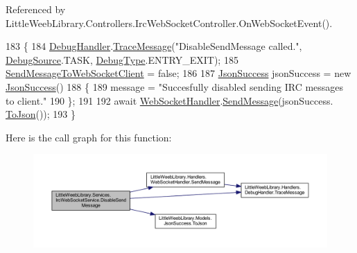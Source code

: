 Referenced by Little\+Weeb\+Library.\+Controllers.\+Irc\+Web\+Socket\+Controller.\+On\+Web\+Socket\+Event().


\begin{DoxyCode}
183         \{
184             \mbox{\hyperlink{class_little_weeb_library_1_1_handlers_1_1_debug_handler}{DebugHandler}}.\mbox{\hyperlink{class_little_weeb_library_1_1_handlers_1_1_debug_handler_afccb37dfd6b2114af72000c2f4fe4607}{TraceMessage}}(\textcolor{stringliteral}{"DisableSendMessage called."}, 
      \mbox{\hyperlink{namespace_little_weeb_library_1_1_handlers_a2a6ca0775121c9c503d58aa254d292be}{DebugSource}}.TASK, \mbox{\hyperlink{namespace_little_weeb_library_1_1_handlers_ab66019ed40462876ec4e61bb3ccb0a62}{DebugType}}.ENTRY\_EXIT);
185             \mbox{\hyperlink{class_little_weeb_library_1_1_services_1_1_irc_web_socket_service_abeb1251a64e640930814f582196f0058}{SendMessageToWebSocketClient}} = \textcolor{keyword}{false};
186 
187             \mbox{\hyperlink{class_little_weeb_library_1_1_models_1_1_json_success}{JsonSuccess}} jsonSuccess = \textcolor{keyword}{new} \mbox{\hyperlink{class_little_weeb_library_1_1_models_1_1_json_success}{JsonSuccess}}()
188             \{
189                 message = \textcolor{stringliteral}{"Succesfully disabled sending IRC messages to client."}
190             \};
191 
192             await \mbox{\hyperlink{class_little_weeb_library_1_1_handlers_1_1_web_socket_handler}{WebSocketHandler}}.\mbox{\hyperlink{class_little_weeb_library_1_1_handlers_1_1_web_socket_handler_a1de289d54d665a32c93478c68d3e6ad0}{SendMessage}}(jsonSuccess.
      \mbox{\hyperlink{class_little_weeb_library_1_1_models_1_1_json_success_a407103dc37a77aaf47a782296bab7518}{ToJson}}());
193         \}
\end{DoxyCode}
Here is the call graph for this function\+:\nopagebreak
\begin{figure}[H]
\begin{center}
\leavevmode
\includegraphics[width=350pt]{class_little_weeb_library_1_1_services_1_1_irc_web_socket_service_a71f89c2a8e9b0a86972d192bc3e55318_cgraph}
\end{center}
\end{figure}
